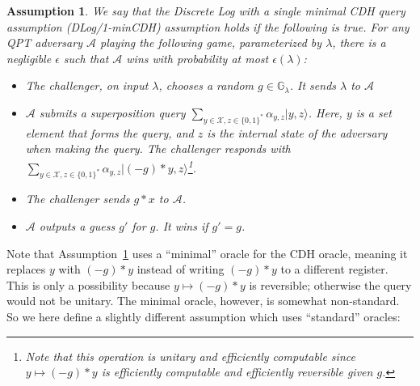 \documentclass{article}\usepackage[a4paper,margin=20mm]{geometry}
\newtheorem{assumption}[theorem]{Assumption}
\numberwithin{theorem}{section}
\numberwithin{equation}{section}
\newcommand{\G}{\mathbb{G}}
\newcommand{\As}{{\mathcal{A}}}
\newcommand{\Xs}{{\mathcal{X}}}
\begin{document}
\begin{assumption}\label{def:dlogminimalcdh} We say that the \emph{Discrete Log with a single minimal CDH query} assumption (DLog/1-minCDH) assumption holds if the following is true. For any QPT adversary $\As$ playing the following game, parameterized by $\lambda$, there is a negligible $\epsilon$ such that $\As$ wins with probability at most $\epsilon(\lambda)$:
	\begin{itemize}
		\item The challenger, on input $\lambda$, chooses a random $g\in\G_\lambda$. It sends $\lambda$ to $\As$
		\item $\As$ submits a superposition query $\sum_{y\in\Xs,z\in\{0,1\}^*}\alpha_{y,z}|y,z\rangle$. Here, $y$ is a set element that forms the query, and $z$ is the internal state of the adversary when making the query. The challenger responds with $\sum_{y\in\Xs,z\in\{0,1\}^*}\alpha_{y,z}|(-g)*y,z\rangle$\enspace\footnote{Note that this operation is unitary and efficiently computable since $y\mapsto(-g)*y$ is efficiently computable and efficiently reversible given $g$.}. 
		\item The challenger sends $g*x$ to $\As$.
		\item $\As$ outputs a guess $g'$ for $g$. It wins if $g'=g$.
	\end{itemize}
\end{assumption}

Note that Assumption~\ref{def:dlogminimalcdh} uses a ``minimal'' oracle for the CDH oracle, meaning it replaces $y$ with $(-g)*y$ instead of writing $(-g)*y$ to a different register. This is only a possibility because $y\mapsto(-g)*y$ is reversible; otherwise the query would not be unitary. The minimal oracle, however, is somewhat non-standard. So we here define a slightly different assumption which uses ``standard'' oracles:
\end{document}
